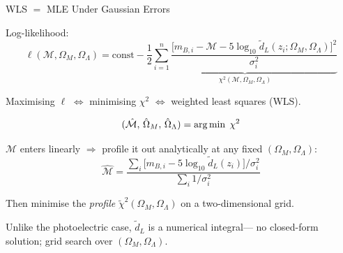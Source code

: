 \documentclass[aspectratio=169]{beamer}
\begin{document}
\begin{frame}{WLS $=$ MLE Under Gaussian Errors}

Log-likelihood:
\[
  \ell(\mathcal{M},\Omega_M,\Omega_\Lambda) =
  \text{const} - \frac{1}{2}
  \underbrace{\sum_{i=1}^n
    \frac{\bigl[m_{B,i} - \mathcal{M}
    - 5\log_{10}\tilde d_L(z_i;\Omega_M,\Omega_\Lambda)\bigr]^2}
    {\sigma_i^2}}_{\displaystyle \chi^2(\mathcal{M},\Omega_M,\Omega_\Lambda)}
\]

\medskip
Maximising $\ell$ $\Leftrightarrow$ minimising $\chi^2$
$\Leftrightarrow$ weighted least squares (WLS).

\[
  (\hat{\mathcal{M}},\,\hat\Omega_M,\,\hat\Omega_\Lambda)
  = \operatornamewithlimits{arg\,min}\; \chi^2
\]

\medskip
$\mathcal{M}$ enters linearly $\Rightarrow$ profile it out analytically
at any fixed $(\Omega_M,\Omega_\Lambda)$:
\[
  \hat{\mathcal{M}} =
  \frac{\sum_i \bigl[m_{B,i} - 5\log_{10}\tilde d_L(z_i)\bigr]/\sigma_i^2}
  {\sum_i 1/\sigma_i^2}
\]

Then minimise the \emph{profile} $\tilde\chi^2(\Omega_M,\Omega_\Lambda)$
on a two-dimensional grid.

\medskip
Unlike the photoelectric case, $\tilde d_L$ is a numerical integral---
no closed-form solution; grid search over $(\Omega_M,\Omega_\Lambda)$.

\end{frame}
\end{document}
